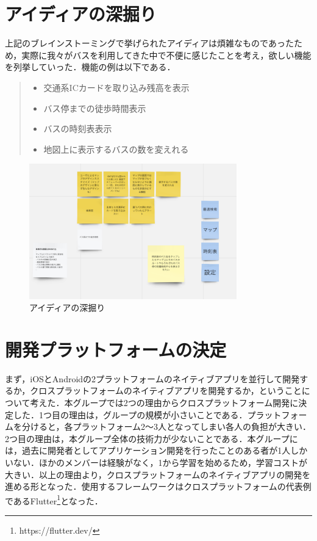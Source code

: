 \section{アイディアの深掘り}

上記のブレインストーミングで挙げられたアイディアは煩雑なものであったため，実際に我々がバスを利用してきた中で不便に感じたことを考え，欲しい機能を列挙していった．機能の例は以下である．

\begin{quote}
    \begin{itemize}
        \item 交通系ICカードを取り込み残高を表示
        \item バス停までの徒歩時間表示
        \item バスの時刻表表示
        \item 地図上に表示するバスの数を変えれる
    \end{itemize}
\end{quote}

\begin{figure}[htbp]
    \centering
    \includegraphics[width=9cm]{images/dig.png}
    \caption{アイディアの深掘り}
    \label{fig:dig}
\end{figure}


\section{開発プラットフォームの決定}
まず，iOSとAndroidの2プラットフォームのネイティブアプリを並行して開発するか，クロスプラットフォームのネイティブアプリを開発するか，ということについて考えた．本グループでは2つの理由からクロスプラットフォーム開発に決定した．1つ目の理由は，グループの規模が小さいことである．プラットフォームを分けると，各プラットフォーム2〜3人となってしまい各人の負担が大きい．2つ目の理由は，本グループ全体の技術力が少ないことである．本グループには，過去に開発者としてアプリケーション開発を行ったことのある者が1人しかいない．ほかのメンバーは経験がなく，1から学習を始めるため，学習コストが大きい．以上の理由より，クロスプラットフォームのネイティブアプリの開発を進める形となった．使用するフレームワークはクロスプラットフォームの代表例であるFlutter\footnote{https://flutter.dev/}となった．

